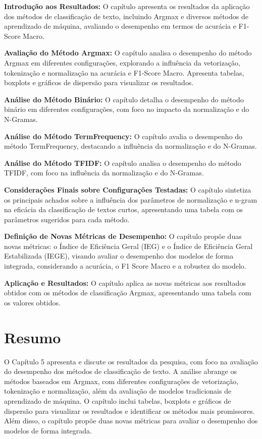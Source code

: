 \documentclass{report}
\begin{document}
\textbf{Introdução aos Resultados:} O capítulo apresenta os resultados da aplicação dos métodos de classificação de texto, incluindo Argmax e diversos métodos de aprendizado de máquina, avaliando o desempenho em termos de acurácia e F1-Score Macro.

\textbf{Avaliação do Método Argmax:} O capítulo analisa o desempenho do método Argmax em diferentes configurações, explorando a influência da vetorização, tokenização e normalização na acurácia e F1-Score Macro. Apresenta tabelas, boxplots e gráficos de dispersão para visualizar os resultados.

\textbf{Análise do Método Binário:} O capítulo detalha o desempenho do método binário em diferentes configurações, com foco no impacto da normalização e do N-Gramas.

\textbf{Análise do Método TermFrequency:} O capítulo avalia o desempenho do método TermFrequency, destacando a influência da normalização e do N-Gramas.

\textbf{Análise do Método TFIDF:} O capítulo analisa o desempenho do método TFIDF, com foco na influência da normalização e do N-Gramas.

\textbf{Considerações Finais sobre Configurações Testadas:} O capítulo sintetiza os principais achados sobre a influência dos parâmetros de normalização e n-gram na eficácia da classificação de textos curtos, apresentando uma tabela com os parâmetros sugeridos para cada método.

\textbf{Definição de Novas Métricas de Desempenho:} O capítulo propõe duas novas métricas: o Índice de Eficiência Geral (IEG) e o Índice de Eficiência Geral Estabilizada (IEGE), visando avaliar o desempenho dos modelos de forma integrada, considerando a acurácia, o F1 Score Macro e a robustez do modelo.

\textbf{Aplicação e Resultados:} O capítulo aplica as novas métricas aos resultados obtidos com os métodos de classificação Argmax, apresentando uma tabela com os valores obtidos.

\section*{Resumo}

O Capítulo 5 apresenta e discute os resultados da pesquisa, com foco na avaliação do desempenho dos métodos de classificação de texto. A análise abrange os métodos baseados em Argmax, com diferentes configurações de vetorização, tokenização e normalização, além da avaliação de modelos tradicionais de aprendizado de máquina. O capítulo inclui tabelas, boxplots e gráficos de dispersão para visualizar os resultados e identificar os métodos mais promissores. Além disso, o capítulo propõe duas novas métricas para avaliar o desempenho dos modelos de forma integrada.
\end{document}
